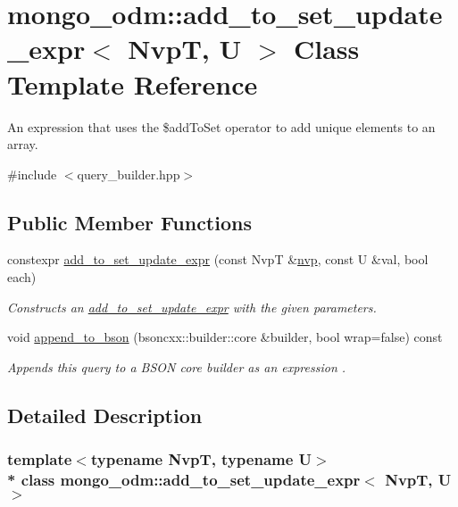\hypertarget{classmongo__odm_1_1add__to__set__update__expr}{}\section{mongo\+\_\+odm\+:\+:add\+\_\+to\+\_\+set\+\_\+update\+\_\+expr$<$ NvpT, U $>$ Class Template Reference}
\label{classmongo__odm_1_1add__to__set__update__expr}


An expression that uses the \$add\+To\+Set operator to add unique elements to an array.  




{\ttfamily \#include $<$query\+\_\+builder.\+hpp$>$}

\subsection*{Public Member Functions}
\begin{DoxyCompactItemize}
\item 
constexpr \hyperlink{classmongo__odm_1_1add__to__set__update__expr_a869ef885d8234508564f29cb798c4470}{add\+\_\+to\+\_\+set\+\_\+update\+\_\+expr} (const NvpT \&\hyperlink{classmongo__odm_1_1nvp}{nvp}, const U \&val, bool each)
\begin{DoxyCompactList}\small\item\em Constructs an \hyperlink{classmongo__odm_1_1add__to__set__update__expr}{add\+\_\+to\+\_\+set\+\_\+update\+\_\+expr} with the given parameters. \end{DoxyCompactList}\item 
void \hyperlink{classmongo__odm_1_1add__to__set__update__expr_a73537eb34459dc928b718076293c7e8a}{append\+\_\+to\+\_\+bson} (bsoncxx\+::builder\+::core \&builder, bool wrap=false) const 
\begin{DoxyCompactList}\small\item\em Appends this query to a B\+S\+ON core builder as an expression \textquotesingle{}. \end{DoxyCompactList}\end{DoxyCompactItemize}


\subsection{Detailed Description}
\subsubsection*{template$<$typename NvpT, typename U$>$\\*
class mongo\+\_\+odm\+::add\+\_\+to\+\_\+set\+\_\+update\+\_\+expr$<$ Nvp\+T, U $>$}

